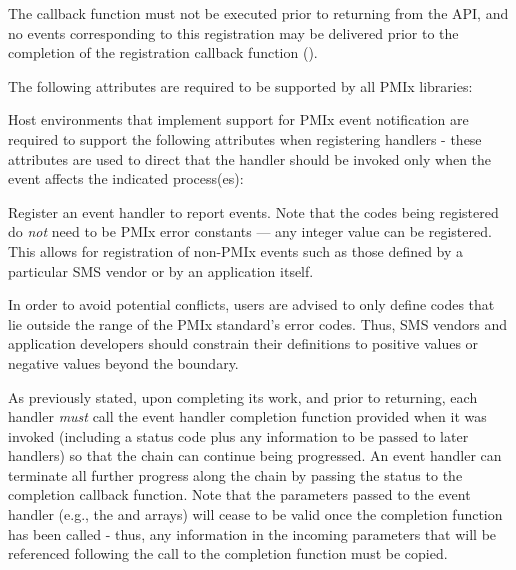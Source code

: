 The callback function must not be executed prior to returning from the \ac{API}, and no events corresponding to this registration may be delivered prior to the completion of the registration callback function ().

\reqattrstart
The following attributes are required to be supported by all \ac{PMIx} libraries:


\divider

Host environments that implement support for \ac{PMIx} event notification are required to support the following attributes when registering handlers - these attributes are used to direct that the handler should be invoked only when the event affects the indicated process(es):


\reqattrend


\descr

Register an event handler to report events. Note that the codes being registered do \textit{not} need to be \ac{PMIx} error constants --- any integer value can be registered. This allows for registration of non-PMIx events such as those defined by a particular \ac{SMS} vendor or by an application itself.

\adviceuserstart
In order to avoid potential conflicts, users are advised to only define codes that lie outside the range of the \ac{PMIx} standard's error codes. Thus, \ac{SMS} vendors and application developers should constrain their definitions to positive values or negative values beyond the  boundary.
\adviceuserend


\adviceuserstart
As previously stated, upon completing its work, and prior to returning, each handler \textit{must} call the event handler completion function provided when it was invoked (including a status code plus any information to be passed to later handlers) so that the chain can continue being progressed. An event handler can terminate all further progress along the chain by passing the  status to the completion callback function. Note that the parameters passed to the event handler (e.g., the  and  arrays) will cease to be valid once the completion function has been called - thus, any information in the incoming parameters that will be referenced following the call to the completion function must be copied.
\adviceuserend

